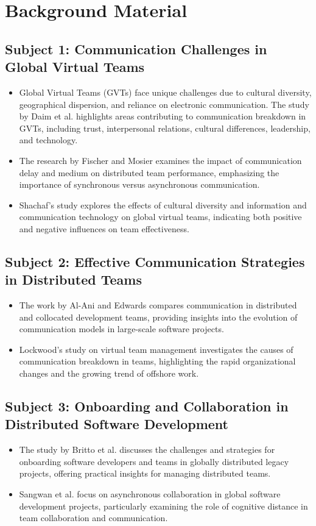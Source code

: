 \documentclass[12pt]{article}
\begin{document}
\section{Background Material}

\subsection{Subject 1: Communication Challenges in Global Virtual Teams}
\begin{itemize}
  \item Global Virtual Teams (GVTs) face unique challenges due to cultural diversity, geographical dispersion, and reliance on electronic communication. The study by Daim et al. \cite{ref7} highlights areas contributing to communication breakdown in GVTs, including trust, interpersonal relations, cultural differences, leadership, and technology.
  \item The research by Fischer and Mosier \cite{ref2} examines the impact of communication delay and medium on distributed team performance, emphasizing the importance of synchronous versus asynchronous communication.
  \item Shachaf's study \cite{ref8} explores the effects of cultural diversity and information and communication technology on global virtual teams, indicating both positive and negative influences on team effectiveness.
\end{itemize}

\subsection{Subject 2: Effective Communication Strategies in Distributed Teams}
\begin{itemize}
  \item The work by Al-Ani and Edwards \cite{ref4} compares communication in distributed and collocated development teams, providing insights into the evolution of communication models in large-scale software projects.
  \item Lockwood's study \cite{ref6} on virtual team management investigates the causes of communication breakdown in teams, highlighting the rapid organizational changes and the growing trend of offshore work.
\end{itemize}

\subsection{Subject 3: Onboarding and Collaboration in Distributed Software Development}
\begin{itemize}
  \item The study by Britto et al. \cite{ref7} discusses the challenges and strategies for onboarding software developers and teams in globally distributed legacy projects, offering practical insights for managing distributed teams.
  \item Sangwan et al. \cite{ref3} focus on asynchronous collaboration in global software development projects, particularly examining the role of cognitive distance in team collaboration and communication.
\end{itemize}
\end{document}
